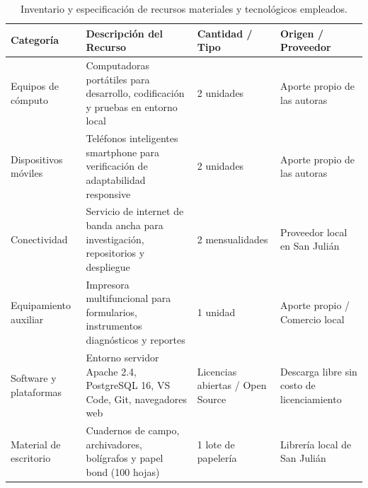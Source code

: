 \begin{table}[htbp]
    \centering
    \caption{Inventario y especificación de recursos materiales y tecnológicos empleados.}
    \label{tab:recursos_materiales}
    \begin{tabularx}{\textwidth}{L L L L}
        \toprule
        \textbf{Categoría} & \textbf{Descripción del Recurso} & \textbf{Cantidad / Tipo} & \textbf{Origen / Proveedor} \\
        \midrule
        Equipos de cómputo & Computadoras portátiles para desarrollo, codificación y pruebas en entorno local & 2 unidades & Aporte propio de las autoras \\
        Dispositivos móviles & Teléfonos inteligentes smartphone para verificación de adaptabilidad responsive & 2 unidades & Aporte propio de las autoras \\
        Conectividad & Servicio de internet de banda ancha para investigación, repositorios y despliegue & 2 mensualidades & Proveedor local en San Julián \\
        Equipamiento auxiliar & Impresora multifuncional para formularios, instrumentos diagnósticos y reportes & 1 unidad & Aporte propio / Comercio local \\
        Software y plataformas & Entorno servidor Apache 2.4, PostgreSQL 16, VS Code, Git, navegadores web & Licencias abiertas / Open Source & Descarga libre sin costo de licenciamiento \\
        Material de escritorio & Cuadernos de campo, archivadores, bolígrafos y papel bond (100 hojas) & 1 lote de papelería & Librería local de San Julián \\
        \bottomrule
    \end{tabularx}
\end{table}
